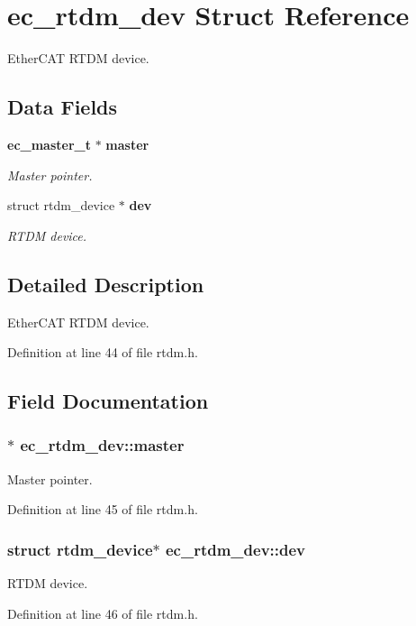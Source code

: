 \section{ec\-\_\-rtdm\-\_\-dev Struct Reference}
\label{structec__rtdm__dev}


Ether\-C\-A\-T R\-T\-D\-M device.  


\subsection*{Data Fields}
\begin{DoxyCompactItemize}
\item 
{\bf ec\-\_\-master\-\_\-t} $\ast$ {\bf master}
\begin{DoxyCompactList}\small\item\em Master pointer. \end{DoxyCompactList}\item 
struct rtdm\-\_\-device $\ast$ {\bf dev}
\begin{DoxyCompactList}\small\item\em R\-T\-D\-M device. \end{DoxyCompactList}\end{DoxyCompactItemize}


\subsection{Detailed Description}
Ether\-C\-A\-T R\-T\-D\-M device. 

Definition at line 44 of file rtdm.\-h.



\subsection{Field Documentation}
\subsubsection[{master}]{$\ast$ ec\-\_\-rtdm\-\_\-dev\-::master}\label{structec__rtdm__dev_a26ad048dd4e31a5e34cfcecea2878a86}


Master pointer. 



Definition at line 45 of file rtdm.\-h.

\subsubsection[{dev}]{\setlength{\rightskip}{0pt plus 5cm}struct rtdm\-\_\-device$\ast$ ec\-\_\-rtdm\-\_\-dev\-::dev}\label{structec__rtdm__dev_a35af4277898eb3c7207df514c0a51653}


R\-T\-D\-M device. 



Definition at line 46 of file rtdm.\-h.

